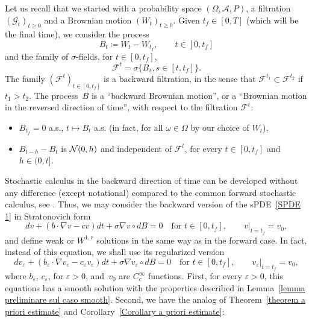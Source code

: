 \documentclass[a4paper,10pt]{article}
\newcommand\1{\mathbbm{1}}
\newcommand{\eps}{\varepsilon}
\numberwithin{equation}{section}
\begin{document}
Let us recall that we started with a probability space $(\Omega,\mathcal{A},P)$, a filtration $(\mathcal{G}_{t})_{t\geq0}$ and a Brownian motion $(W_{t})_{t\geq0}$. Given $t_{f}\in [0,T]$ (which will be the final time), we consider the process
\begin{equation}
B_{t}\coloneqq W_{t}-W_{t_{f}},\qquad t\in [0,t_{f}]
\end{equation}
and the family of $\sigma$-fields, for $t \in [0,t_{f}]$,
\begin{equation}
\mathcal{F}^{t}=\sigma \{  B_{s},s\in [t,t_{f}] \} .
\end{equation}
The family $(\mathcal{F}^{t})_{t\in [0,t_{f}]}$ is a backward filtration, in the sense that $\mathcal{F}^{t_{1}} \subset\mathcal{F}^{t_{2}}$ if $t_{1}>t_{2}$. The process~$B$ is a
``backward Brownian motion'', or a ``Brownian motion in the reversed direction of time'', with respect to the filtration $\mathcal{F}^{t}$:

\begin{itemize}
  \item $B_{t_{f}}=0$ a.s., $t\mapsto B_{t}$ a.s. (in fact, for all $\omega \in \Omega$ by our choice of $W_t$), 
  \item $B_{t-h}-B_{t}$ is ${\cal N}(0,h)$ and independent of $\mathcal{F}^{t}$, for every $t\in [0,t_{f}]$ and $h \in (0,t]$.
\end{itemize}

Stochastic calculus in the backward direction of time can be developed without any difference (except notational) compared to the common forward stochastic calculus, see \cite[Chapter~3]{KUNITA84}. Thus, we may consider the backward version of the sPDE~\eqref{SPDE 1} in Stratonovich form
\begin{equation*}
dv+ ( b\cdot\nabla v  -cv)  dt+\sigma\nabla v\circ
dB  =0 \quad \text{for } t\in [0,t_{f}], \qquad
v|_{t=t_{f}}  =v_{0} ,
\end{equation*}
and define weak or $W^{1,r}$ solutions in the same way as in the forward case. In fact, instead of this equation, we shall use its regularized version
\begin{equation}
\label{backward SPDE 1}
dv_{\eps} + ( b_{\eps}\cdot\nabla v_{\eps} -c_{\eps}v_{\eps})  dt+\sigma\nabla v_{\eps}\circ dB 
=0 \quad \text{for } t\in [0,t_{f}], \qquad v_{\eps}|_{t=t_{f}}  =v_{0} ,
\end{equation}
where $b_{\eps}$, $c_{\eps}$, for $\eps>0$, and~$v_{0}$ are $C_{c}^{\infty}$ functions. First, for every $\eps>0$, this equations has a smooth solution with the properties described in Lemma~\ref{lemma preliminare sul caso smooth}. Second, we have the analog of Theorem~\ref{theorem a priori estimate} and Corollary~\ref{Corollary a priori estimate}:
\end{document}
